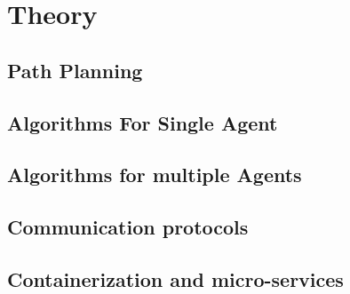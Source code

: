 \chapter{Theory}

\section{Path Planning}


\section{Algorithms For Single Agent}


\section{Algorithms for multiple Agents}


\section{Communication protocols}


\section{Containerization and micro-services}
